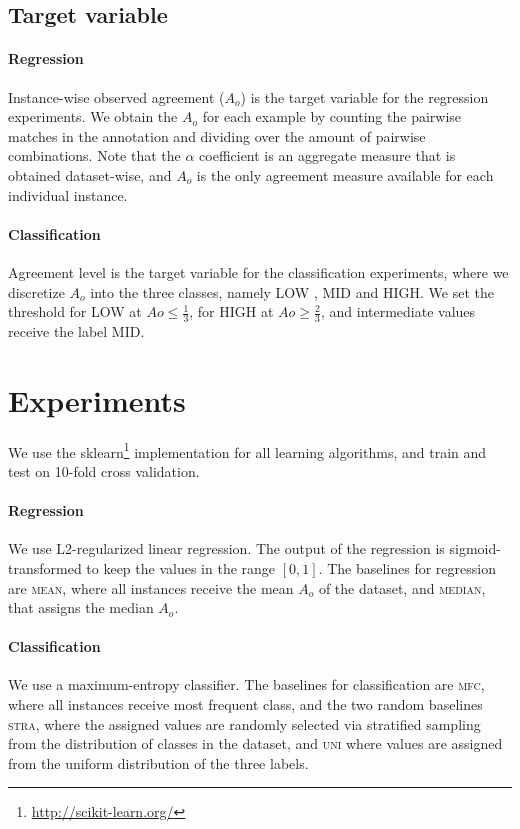 \documentclass[11pt,a4paper]{article}
\begin{document}
\subsection{Target variable}
\label{sec:targetvariable}
\paragraph*{Regression} Instance-wise observed agreement ($A_o$) is the target variable for the regression experiments. We obtain  the $A_o$ for each example by counting the pairwise matches in the annotation and dividing over the amount of pairwise combinations. 
Note that the $\alpha$ coefficient is an aggregate measure that is obtained dataset-wise, and $A_o$ is the only agreement measure available for each individual instance.
\paragraph*{Classification} Agreement level is the target variable for the classification experiments, where we discretize $A_o$ into the three classes, namely LOW , MID and HIGH. We set the threshold for LOW at $Ao \le \frac{1}{3}$, for HIGH at $Ao \ge \frac{2}{3}$, and intermediate values receive the label MID.


\section{Experiments}
We use the sklearn\footnote{\url{http://scikit-learn.org/}} implementation for all learning algorithms, and train and test on 10-fold cross validation.
\paragraph{Regression} We use L2-regularized linear regression. The output of the regression is sigmoid-transformed to keep the values in the range $[0,1]$. The baselines for regression are \textsc{mean}, where all instances receive the mean $A_o$ of the dataset, and  \textsc{median}, that assigns the median $A_o$. 
\paragraph{Classification} We use a maximum-entropy classifier. The baselines for classification are \textsc{mfc}, where all instances receive most frequent class, and the two random baselines \textsc{stra}, where the assigned values are randomly selected via stratified sampling from the distribution of classes in the dataset, and \textsc{uni} where values are assigned from the uniform distribution of the three labels. 
\end{document}
